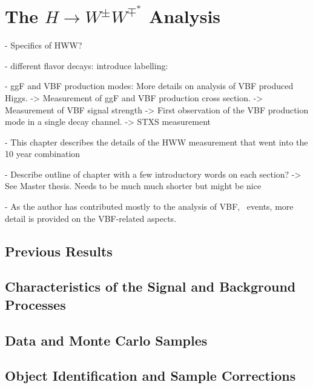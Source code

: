 \chapter{The $H\rightarrow W^{\pm}W^{\mp^*}$ Analysis}
\label{chap:hww}

- Specifics of HWW?

- different flavor decays: introduce labelling: \HWWdet 

- ggF and VBF production modes: More details on analysis of VBF produced Higgs. 
    -> Measurement of ggF and VBF production cross section.
    -> Measurement of VBF signal strength -> First observation of the VBF production mode in a single decay channel. 
    -> STXS measurement

- This chapter describes the details of the HWW measurement that went into the 10 year combination

- Describe outline of chapter with a few introductory words on each section?
    -> See Master thesis. Needs to be much much shorter but might be nice


- As the author has contributed mostly to the analysis of VBF, \HWW\ events, more detail is provided on the VBF-related aspects.



\section{Previous Results}
\label{sec:prev-results}



\section{Characteristics of the Signal and Background Processes}
\label{sec:signal-bkg-characteristics}



\section{Data and Monte Carlo Samples}
\label{sec:data-mc-samples}



\section{Object Identification and Sample Corrections}
\label{sec:object-selection}



